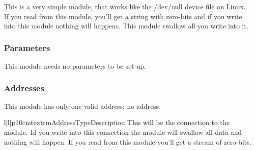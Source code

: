 %
%
This is a very simple module, that works like the /dev/null device file on 
Linux. If you read from this module, you'll get a string with zero-bits and
if you write into this module nothing will happens. This module swallow all
you write into it.

\subsubsection{Parameters}
This module needs no parameters to be set up.

\subsubsection{Addresses}
This module has only one valid address: no address.
\begin{tableiii}{l|l|p{10cm}}{textrm}{Address}{Type}{Description}
\lineiii{---}
        {}
        {This will be the connection to the  module. Id you
         write into this connection the module will swallow all data and
         nothing will happen. If you read from this module you'll get a 
         stream of zero-bits.}
\end{tableiii}

